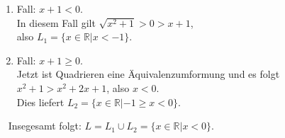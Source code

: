 	\begin{enumerate}
	\item Fall: $x+1<0$.\\
	In diesem Fall gilt $\sqrt{x^2+1}>0>x+1$,\\
	also $L_1=\{x\in\mathbb{R}|x<-1\}$.
	\item Fall: $x+1\geq 0$.\\
	Jetzt ist Quadrieren eine Äquivalenzumformung und es folgt $x^2+1>x^2+2x+1$, also $x<0$.\\
	Dies liefert $L_2=\{x\in\mathbb{R}|-1\geq x <0 \}.$
	\end{enumerate}
	~\newline
	Insegesamt folgt: $L=L_1\cup L_2 = \{x\in \mathbb{R}|x<0\}$.
